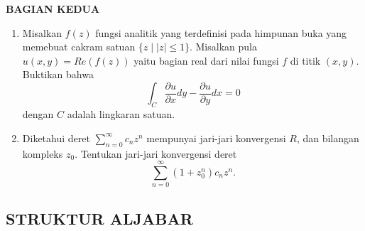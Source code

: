 \documentclass[12pt,twoside]{article}
\begin{document}
\newpage \textbf{BAGIAN KEDUA}
\begin{enumerate}
	\item Misalkan $f(z)$ fungsi analitik yang terdefinisi pada himpunan buka yang memebuat cakram satuan $\{z\mid |z|\leq 1\}$. Misalkan pula $u(x,y)=Re(f(z))$ yaitu bagian real dari nilai fungsi $f$ di titik $(x,y)$. Buktikan bahwa
	      $$\int_{C}\dfrac{\partial u}{\partial x}dy-\dfrac{\partial u}{\partial y}dx=0$$
	      dengan $C$ adalah lingkaran satuan.
	\item Diketahui deret $\displaystyle \sum_{n=0}^{\infty}c_nz^n$ mempunyai jari-jari konvergensi $R$, dan bilangan kompleks $z_0$. Tentukan jari-jari konvergensi deret
	      $$\sum_{n=0}^{\infty}\left(1+z_0^n\right)c_nz^n.$$
\end{enumerate}
\pagebreak
\newpage \subsection{STRUKTUR ALJABAR}
\end{document}

